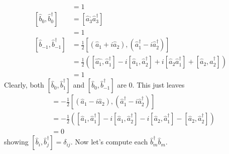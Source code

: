 \documentclass[../qft-for-the-gifted-amateur.tex]{subfiles}
\begin{document}
\begin{questions}
\begin{solution}
\begin{align*}
							&= 1 \\
		[{\hat{b}}_{0},{\hat{b}}_{0}^{\dagger}] &= [{\hat{a}}_{3}^{,}{\hat{a}}_{3}^{\dagger}] \\
							&= 1 \\
		[{\hat{b}}_{- 1},{\hat{b}}_{- 1}^{\dagger}] &= \frac{1}{2}[({\hat{a}}_{1} + i{\hat{a}}_{2}),({\hat{a}}_{1}^{\dagger} - i{\hat{a}}_{2}^{\dagger})] \\
						      &= \frac{1}{2}([\hat{a_{1}},{\hat{a}}_{1}^{\dagger}] - i[{\hat{a}}_{1},{\hat{a}}_{2}^{\dagger}] + i[{\hat{a}}_{2}{\hat{a}}_{1}^{\dagger}] + [{\hat{a}}_{2},{\hat{a}}_{2}^{\dagger}]) \\
						      &= 1
	\end{align*}
	Clearly, both $[{\hat{b}}_{0},{\hat{b}}_{1}^{\dagger}]$ and $[{\hat{b}}_{0},{\hat{b}}_{- 1}^{\dagger}]$ are $0$. This just leaves
	\begin{align*}
		[{\hat{b}}_{1},{\hat{b}}_{- 1}^{\dagger}] &= - \frac{1}{2}[({\hat{a}}_{1} - i{\hat{a}}_{2}),({\hat{a}}_{1}^{\dagger} - i{\hat{a}}_{2}^{\dagger})] \\
							  &= - \frac{1}{2}([{\hat{a}}_{1},{\hat{a}}_{1}^{\dagger}] - i[{\hat{a}}_{1},{\hat{a}}_{2}^{\dagger}] - i[{\hat{a}}_{2},{\hat{a}}_{1}^{\dagger}] - [{\hat{a}}_{2},{\hat{a}}_{2}^{\dagger}]) \\
							  &= 0
	\end{align*}
	showing $[{\hat{b}}_{i},{\hat{b}}_{j}^{\dagger}] = \delta_{ij}.$ Now let's compute each ${\hat{b}}_{m}^{\dagger}{\hat{b}}_{m}$.


\end{solution}
\end{questions}
\end{document}
